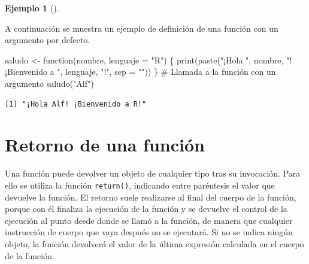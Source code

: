 \documentclass[
  a4paper,
]{scrreport}
\newenvironment{Shaded}{\begin{snugshade}}{\end{snugshade}}
\newcommand{\AttributeTok}[1]{\textcolor[rgb]{0.40,0.45,0.13}{#1}}
\newcommand{\CommentTok}[1]{\textcolor[rgb]{0.37,0.37,0.37}{#1}}
\newcommand{\ControlFlowTok}[1]{\textcolor[rgb]{0.00,0.23,0.31}{#1}}
\newcommand{\FunctionTok}[1]{\textcolor[rgb]{0.28,0.35,0.67}{#1}}
\newcommand{\NormalTok}[1]{\textcolor[rgb]{0.00,0.23,0.31}{#1}}
\newcommand{\OtherTok}[1]{\textcolor[rgb]{0.00,0.23,0.31}{#1}}
\newcommand{\StringTok}[1]{\textcolor[rgb]{0.13,0.47,0.30}{#1}}
\theoremstyle{definition}
\newtheorem{example}{Ejemplo}[chapter]
\theoremstyle{definition}
\theoremstyle{remark}
\begin{document}
\leavevmode{}%
\begin{example}[]\label{exm-argumento-defecto-funcion}

A continuación se muestra un ejemplo de definición de una función con un
argumento por defecto.

\begin{Shaded}
\begin{Highlighting}[]
\NormalTok{saludo }\OtherTok{\textless{}{-}} \ControlFlowTok{function}\NormalTok{(nombre, }\AttributeTok{lenguaje =} \StringTok{"R"}\NormalTok{) \{}
  \FunctionTok{print}\NormalTok{(}\FunctionTok{paste}\NormalTok{(}\StringTok{"¡Hola "}\NormalTok{, nombre, }\StringTok{"! ¡Bienvenido a "}\NormalTok{, lenguaje, }\StringTok{"!"}\NormalTok{, }\AttributeTok{sep =} \StringTok{""}\NormalTok{))}
\NormalTok{\}}
\CommentTok{\# Llamada a la función con un argumento}
\FunctionTok{saludo}\NormalTok{(}\StringTok{"Alf"}\NormalTok{)}
\end{Highlighting}
\end{Shaded}

\begin{verbatim}
[1] "¡Hola Alf! ¡Bienvenido a R!"
\end{verbatim}

\end{example}

\hypertarget{retorno-de-una-funciuxf3n}{%
\section{Retorno de una función}\label{retorno-de-una-funciuxf3n}}

Una función puede devolver un objeto de cualquier tipo tras su
invocación. Para ello se utiliza la función \texttt{return()}, indicando
entre paréntesis el valor que devuelve la función. El retorno suele
realizarse al final del cuerpo de la función, porque con él finaliza la
ejecución de la función y se devuelve el control de la ejecución al
punto desde donde se llamó a la función, de manera que cualquier
instrucción de cuerpo que vaya después no se ejecutará. Si no se indica
ningún objeto, la función devolverá el valor de la última expresión
calculada en el cuerpo de la función.
\end{document}
